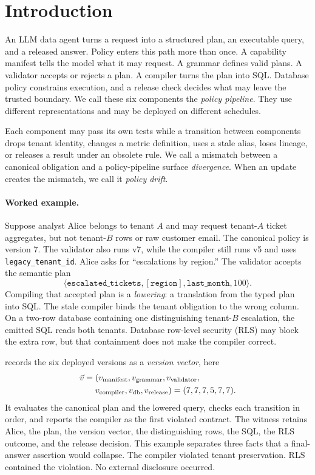 \section{Introduction}

An LLM data agent turns a request into a structured plan, an executable query, and a released answer. Policy enters this path more than once. A capability manifest tells the model what it may request. A grammar defines valid plans. A validator accepts or rejects a plan. A compiler turns the plan into SQL. Database policy constrains execution, and a release check decides what may leave the trusted boundary. We call these six components the \emph{policy pipeline}. They use different representations and may be deployed on different schedules.

Each component may pass its own tests while a transition between components drops tenant identity, changes a metric definition, uses a stale alias, loses lineage, or releases a result under an obsolete rule. We call a mismatch between a canonical obligation and a policy-pipeline surface \emph{divergence}. When an update creates the mismatch, we call it \emph{policy drift}.

\paragraph{Worked example.}
Suppose analyst Alice belongs to tenant $A$ and may request tenant-$A$ ticket aggregates, but not tenant-$B$ rows or raw customer email. The canonical policy is version 7. The validator also runs v7, while the compiler still runs v5 and uses \texttt{legacy\_tenant\_id}. Alice asks for ``escalations by region.'' The validator accepts the semantic plan
\[
\langle\texttt{escalated\_tickets},[\texttt{region}],
\texttt{last\_month},100\rangle .
\]
Compiling that accepted plan is a \emph{lowering}: a translation from the typed plan into SQL. The stale compiler binds the tenant obligation to the wrong column. On a two-row database containing one distinguishing tenant-$B$ escalation, the emitted SQL reads both tenants. Database row-level security (RLS) may block the extra row, but that containment does not make the compiler correct.

\policystrata{} records the six deployed versions as a \emph{version vector}, here
\[
\begin{aligned}
\vec v={}&(v_{\rm manifest},v_{\rm grammar},v_{\rm validator},\\
          &v_{\rm compiler},v_{\rm db},v_{\rm release})
          =(7,7,7,5,7,7).
\end{aligned}
\]
It evaluates the canonical plan and the lowered query, checks each transition in order, and reports the compiler as the first violated contract. The witness retains Alice, the plan, the version vector, the distinguishing rows, the SQL, the RLS outcome, and the release decision. This example separates three facts that a final-answer assertion would collapse. The compiler violated tenant preservation. RLS contained the violation. No external disclosure occurred.

